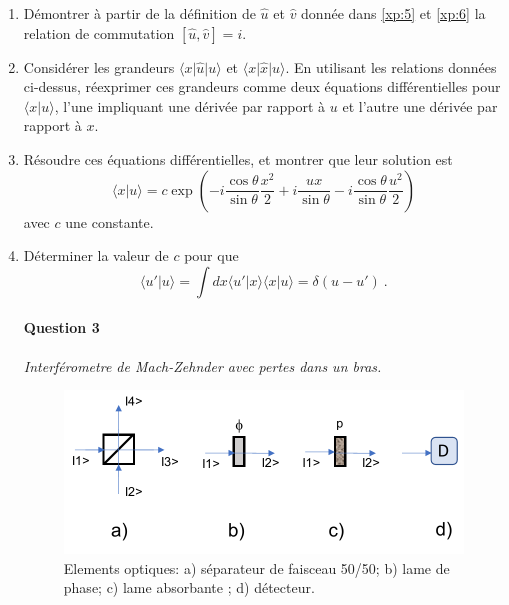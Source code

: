 \begin{enumerate}


\item 
Démontrer  à partir de la définition de $\hat u$ et $\hat v$ donnée dans  \eqref{xp:5} et \eqref{xp:6} la relation de commutation  $[\hat u, \hat v ] = i$.

\item
Considérer les grandeurs $\langle x \vert \hat u \vert u\rangle $ et $\langle x \vert \hat x \vert u\rangle$. En utilisant les relations données ci-dessus, réexprimer ces grandeurs comme deux équations différentielles pour $\langle x \vert u\rangle$, l'une impliquant une dérivée par rapport à $u$ et l'autre une dérivée par rapport à $x$.

\item
Résoudre ces équations différentielles, et montrer que leur solution est
\begin{equation}
\langle x \vert u \rangle =  c  \exp \left( - i \frac{\cos \theta}{\sin \theta}\frac{x^2}{2} + i \frac{u x}{\sin \theta} - i \frac{\cos \theta}{\sin \theta}\frac{u^2}{2} \right)
\end{equation}
avec $c$ une constante.

\item
Déterminer la valeur de $c$ pour que 
\begin{equation}
\langle u' \vert u \rangle = \int dx \langle u' \vert x \rangle \langle x \vert u \rangle = \delta (u - u') \ .
\end{equation}

\paragraph{Question 3} \textit{Interférometre de Mach-Zehnder avec pertes dans un bras.} \\

\begin{figure}[h!]
\begin{center}
\includegraphics[width=0.9\columnwidth]{Pictures/Fig-Optique.pdf} 
\end{center}
\caption{Elements optiques: a) séparateur de faisceau 50/50; b) lame de phase; c) lame absorbante ; d) détecteur.}
\label{fig:Optique}
\end{figure}


\end{enumerate}
